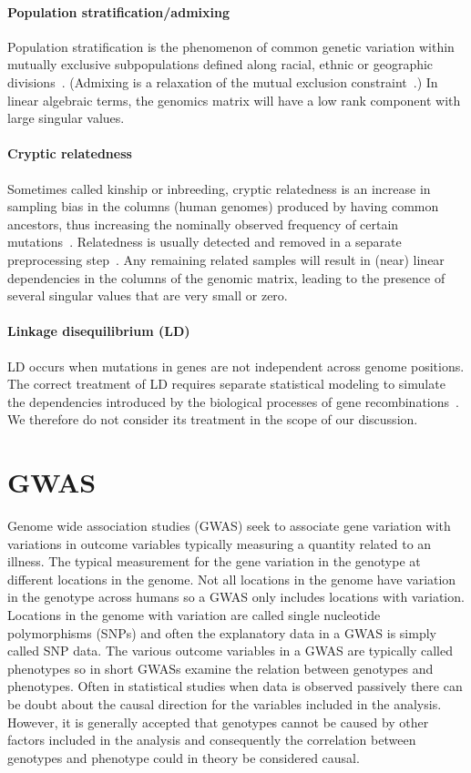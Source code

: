 \documentclass[final,leqno]{siamltex1213}
\begin{document}
\paragraph{Population stratification/admixing}
Population stratification is the phenomenon of common genetic variation within
mutually exclusive subpopulations defined along racial, ethnic or geographic
divisions~\cite{Pritchard1999,Cardon2003}. (Admixing is a relaxation of the mutual exclusion constraint~\cite{Devlin1999,Sankararaman2008}.)
In linear algebraic terms, the genomics matrix will have a low rank component
with large singular values.

\paragraph{Cryptic relatedness}
Sometimes called kinship or inbreeding, cryptic relatedness is an increase in
sampling bias in the columns (human genomes) produced by having common ancestors,
thus increasing the nominally observed frequency of certain
mutations~\cite{Voight2005,Astle2009}. Relatedness is usually detected and removed in
a separate preprocessing step~\cite{PLINK}. Any remaining related samples will
result in (near) linear dependencies in the columns of the genomic matrix,
leading to the presence of several singular values that are very small or zero.

\paragraph{Linkage disequilibrium (LD)}
LD occurs when mutations in genes are not independent across genome positions.
The correct treatment of LD requires separate statistical modeling to simulate
the dependencies introduced by the biological processes of gene
recombinations~\cite{Li2003}.
We therefore do not consider its treatment in the scope of our discussion.

\section{GWAS}
Genome wide association studies (GWAS) seek to associate gene variation with variations in outcome variables typically measuring a quantity related to an illness. The typical measurement for the gene variation in the genotype at different locations in the genome. Not all locations in the genome have variation in the genotype across humans so a GWAS only includes locations with variation. Locations in the genome with variation are called single nucleotide polymorphisms (SNPs) and often the explanatory data in a GWAS is simply called SNP data. The various outcome variables in a GWAS are typically called phenotypes so in short GWASs examine the relation between genotypes and phenotypes. Often in statistical studies when data is observed passively there can be doubt about the causal direction for the variables included in the analysis. However, it is generally accepted that genotypes cannot be caused by other factors included in the analysis and consequently the correlation between genotypes and phenotype could in theory be considered causal.
\end{document}
